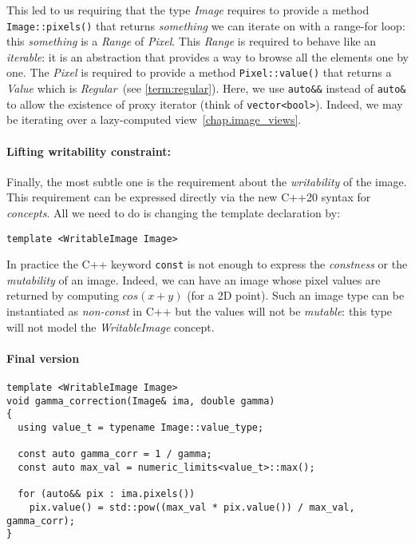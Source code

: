 \noindent This led to us requiring that the type \emph{Image} requires to provide a method \texttt{Image::pixels()} that
returns \emph{something} we can iterate on with a range-for loop: this \emph{something} is a \emph{Range} of
\emph{Pixel}. This \emph{Range} is required to behave like an \emph{iterable}: it is an abstraction that provides a way
to browse all the elements one by one. The \emph{Pixel} is required to provide a method \texttt{Pixel::value()} that
returns a \emph{Value} which is \emph{Regular}~(see \cref{term:regular}). Here, we use \texttt{auto\&\&} instead of
\texttt{auto\&} to allow the existence of proxy iterator (think of \texttt{vector<bool>}). Indeed, we may be iterating
over a lazy-computed view~\cref{chap.image_views}.



\paragraph{Lifting writability constraint:}
Finally, the most subtle one is the requirement about the \emph{writability} of the image. This requirement can be
expressed directly via the new C++20 syntax for \emph{concepts}. All we need to do is changing the template declaration
by:

\begin{verbatim}
template <WritableImage Image>
\end{verbatim}

\noindent In practice the C++ keyword \texttt{const} is not enough to express the \emph{constness} or the
\emph{mutability} of an image. Indeed, we can have an image whose pixel values are returned by computing $cos(x+y)$ (for
a 2D point). Such an image type can be instantiated as \emph{non-const} in C++ but the values will not be
\emph{mutable}: this type will not model the \emph{WritableImage} concept.



\paragraph{Final version}

\begin{verbatim}
template <WritableImage Image>
void gamma_correction(Image& ima, double gamma)
{
  using value_t = typename Image::value_type;

  const auto gamma_corr = 1 / gamma;
  const auto max_val = numeric_limits<value_t>::max();

  for (auto&& pix : ima.pixels())
    pix.value() = std::pow((max_val * pix.value()) / max_val, gamma_corr);
}
\end{verbatim}

